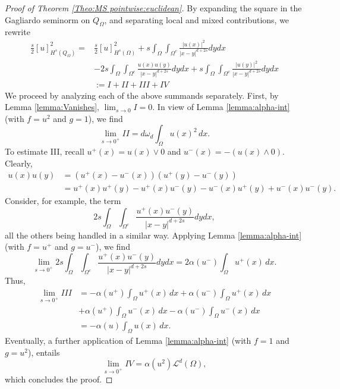 \documentclass[reqno,11pt]{amsart}
\numberwithin{equation}{section}
\theoremstyle{definition} %
\theoremstyle{plain}
\theoremstyle{definition}
\theoremstyle{remark}
\def\O{\Omega}
\def\o{\omega}
\def\io{\int_\Omega}
\def\semin#1#2{ [#1 ]_{#2}}
\def\L{\mathcal{L}}
\newcommand{\abs}[1]{\left|#1\right|}
\begin{document}
\begin{proof}[Proof of Theorem \ref{Theo:MS pointwise:euclidean}]
    By expanding the square in the Gagliardo seminorm on $Q_\O$, and separating local and mixed contributions, we rewrite
    \begin{equation}
    \begin{split}
        \frac{s}{2}\semin{u}{H^s(Q_\Omega)}^2=&\frac{s}{2}\semin{u}{H^s(\Omega)}^2
        +s\io\int_{{\Omega^c}} \frac{\abs{u(x)}^2}{\abs{x-y}^{d+2s}}dydx\\
        &-2s\io\int_{{\Omega^c}} \frac{u(x)u(y)}{\abs{x-y}^{d+2s}}dydx
        +s\io\int_{{\Omega^c}} \frac{\abs{u(y)}^2}{\abs{x-y}^{d+2s}}dydx\\
        &:=I+II+III+IV     
    \end{split}
    \end{equation}
    We proceed by analyzing each of the above summands separately. First, by Lemma \ref{lemma:Vanishes}, $\lim_{s\to 0}I=0$.
    In view of Lemma \ref{lemma:alpha-int} (with $f=u^2$ and $g=1$), we find
    \begin{equation}
        \lim_{s\to0^+}   II=d\o_d\int_{\O}u(x)^2\,dx.
    \end{equation}
    To estimate III, recall $u^+(x)=u(x)\lor 0$ and $u^-(x)=-(u(x)\land 0)$. Clearly, 
    \begin{equation*}
        \begin{split}
            u(x)u(y)&=(u^+(x)-u^-(x))(u^+(y)-u^-(y))\\
            &=u^+(x)u^+(y)-u^+(x)u^-(y)-u^-(x)u^+(y)+u^-(x)u^-(y).
        \end{split}
    \end{equation*}
    Consider, for example, the term
    \begin{equation*}
         2s\io\int_{{\Omega^c}} \frac{u^+(x)u^-(y)}{\abs{x-y}^{d+2s}}dydx,
    \end{equation*}
    all the others being handled in a similar way. Applying Lemma \ref{lemma:alpha-int} (with $f=u^+$ and $g=u^-$), we find
    \begin{equation*}
 \lim_{s\to0^+}2s\io\int_{{\Omega^c}} \frac{u^+(x)u^-(y)}{\abs{x-y}^{d+2s}}dydx=2\alpha(u^-)\int_{\O}u^+(x)\,dx.
    \end{equation*}
    Thus,
    \begin{equation*}
        \begin{split}
            \lim_{s\to0^+}III & =-\alpha(u^+)\int_{\O}u^+(x)\,dx+\alpha(u^-)\int_{\O}u^+(x)\,dx\\
            &+\alpha(u^+)\int_{\O}u^-(x)\,dx-\alpha(u^-)\int_{\O}u^-(x)\,dx\\
            &=-\alpha(u)\int_{\O}u(x)\,dx.
        \end{split}
    \end{equation*}
    Eventually, a further application of Lemma \ref{lemma:alpha-int} (with $f=1$ and $g=u^2$), entails
    \begin{equation}
        \label{Eq:MSExtEuProof:IV}
        \lim_{s\to0^+}IV=\alpha(u^2)\L^d(\O),
    \end{equation}
    which concludes the proof.
\end{proof}
\end{document}
